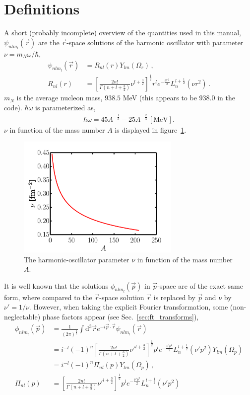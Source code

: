 \documentclass[10pt]{article}
\begin{document}
\section{Definitions}
\label{sec:def}
A short (probably incomplete) overview of the quantities used in this manual,
$\psi_{n l m_{l}} (\vec{r})$ are the $\vec{r}$-space solutions of the harmonic oscillator with parameter $\nu = m_{N} \omega / \hbar $,
\begin{align}
\psi_{n l m_{l}}(\vec{r}) &= R_{n l} (r) Y_{l m}(\Omega_{r}) \, , \\
R_{n l}(r) &= \left[ \frac{ 2n!}{\Gamma(n+l+\frac{3}{2})} \nu^{l+\frac{3}{2}} \right]^{\frac{1}{2}} r^{l} e^{-\frac{\nu r^{2}}{2}} L_{n}^{l+\frac{1}{2}}( \nu r^{2}) \, .
\end{align}
$m_N$ is the average nucleon mass, $938.5$ MeV (this appears to be $938.0$ in the code).
$\hbar \omega$ is parameterized as,
\begin{align}
	\hbar \omega = 45 A^{-\frac{1}{3}} - 25 A^{-\frac{2}{3}} \, [\text{MeV}] .
\end{align}
$\nu$ in function of the mass number $A$ is displayed in figure~\ref{fig:Adepnu}.
\begin{figure}
\centering
\includegraphics[width=0.7\textwidth]{figures/Adepnu.pdf}
\caption{The harmonic-oscillator parameter $\nu$ in function of the mass number $A$.}
\label{fig:Adepnu}
\end{figure}
It is well known that the solutions $\phi_{n l m_{l}} (\vec{p})$  in $\vec{p}$-space are of the exact same form, where compared to the $\vec{r}$-space solution $\vec{r}$ is replaced by $\vec{p}$ and $\nu$ by $\nu' = 1/\nu$.
However, when taking the explicit Fourier transformation, some (non-neglectable) phase factors appear (see Sec.~\ref{sec:ft_transforms}),
\begin{align}
	\phi_{n l m_{l}}(\vec{p}) &= \frac{1}{(2\pi)^{ \frac{3}{2}}}  \int \text{d}^{3} \vec{r} e^{- i \vec{p} \cdot \vec{r}} \psi_{n l m_{l}}(\vec{r}) \\
	&= i^{-l} (-1)^{n} \left[ \frac{ 2n!}{\Gamma(n+l+\frac{3}{2})} \nu'^{l+\frac{3}{2}} \right]^{\frac{1}{2}} p^{l} e^{-\frac{\nu' p^{2}}{2}} L_{n}^{l+\frac{1}{2}}(\nu'p^{2})  Y_{l m}(\Omega_p) \\
	&= i^{-l} (-1)^{n} \Pi_{n l}(p)  Y_{l m}(\Omega_p) \, , \\
 \Pi_{n l}(p) &= \left[ \frac{ 2n!}{\Gamma(n+l+\frac{3}{2})} \nu'^{l+\frac{3}{2}} \right]^{\frac{1}{2}} p^{l} e^{-\frac{\nu' p^{2}}{2}} L_{n}^{l+\frac{1}{2}}(\nu'p^{2})
\end{align}
\end{document}
